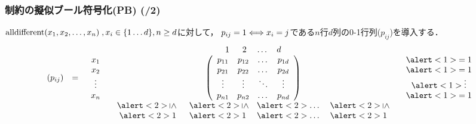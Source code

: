 \begin{frame}
    \frametitle{{\alldiff}制約の擬似ブール符号化(PB) (/2)}
    \begin{exampleblock}{}
        $\textrm{alldifferent}(x_1,x_2,\ldots,x_n) \;, x_i \in \{ 1 \dots d \}, n \geq d$に対して，
        $p_{ij}=1 \Longleftrightarrow x_i=j$である$n$行$d$列の0-1行列($p_{ij}$)を導入する．
        \begin{displaymath}
            \begin{array}{ccccc}
             & & & \begin{array}{cccc}  1\;\;&2&\;\dots&d \end{array}&\\
                (p_{ij})&=&
                \begin{array}{c}x_1\\ x_2\\ \vdots\\ x_n \end{array}&
                \left(
                    \begin{array}{cccc}
                        p_{11}&p_{12}&\dots&p_{1d}\\
                        p_{21}&p_{22}&\dots&p_{2d}\\
                        \vdots&\vdots&\ddots&\vdots\\
                        p_{n1}&p_{n2}&\dots&p_{nd}
                \end{array}\right)&
                \begin{array}{c} \alert<1>{= 1}\\ \alert<1>{= 1}\\ \alert<1>{\vdots}\\ \alert<1>{= 1} \end{array}\\
                & & & \begin{array}{cccc}  
                \alert<2>{\rotatebox[origin=c]{-90}{$\leq$}}\;\;&
                \alert<2>{\rotatebox[origin=c]{-90}{$\leq$}}&
                \alert<2>{\dots}\;&
                \alert<2>{\rotatebox[origin=c]{-90}{$\leq$}} 
                \end{array}&\\
                & & & \begin{array}{cccc}  \alert<2>{1}\;\;&\alert<2>{1}&\;\alert<2>{\dots}\;&\alert<2>{1} \end{array}&

\end{array}
\end{displaymath}
\end{exampleblock}
\end{frame}

